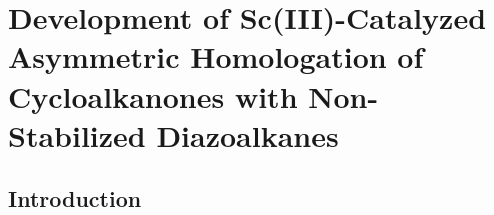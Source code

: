 \captionsetup[figure]{list=no} %

\chapter{Development of Sc(III)-Catalyzed Asymmetric Homologation of\\
 Cycloalkanones with Non-Stabilized Diazoalkanes}
 \label{chp:asymmetric}
 \pagebreak
 
 \section{Introduction}
 \doublespacing
 
